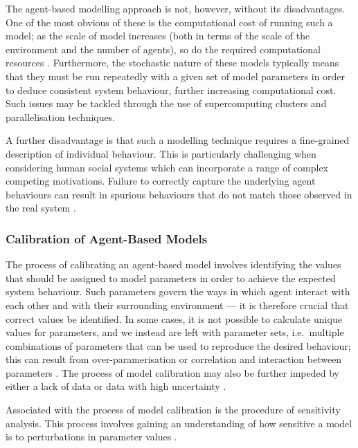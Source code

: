 The agent-based modelling approach is not, however, without its disadvantages.
One of the most obvious of these is the computational cost of running such a
model; as the scale of model increases (both in terms of the scale of the
environment and the number of agents), so do the required computational
resources \citep{bonabeau2002agent}.
Furthermore, the stochastic nature of these models typically means that they
must be run repeatedly with a given set of model parameters in order to deduce
consistent system behaviour, further increasing computational cost.
Such issues may be tackled through the use of supercomputing clusters and
parallelisation techniques.

A further disadvantage is that such a modelling technique requires a
fine-grained description of individual behaviour.
This is particularly challenging when considering human social systems which can
incorporate a range of complex competing motivations.
Failure to correctly capture the underlying agent behaviours can result in
spurious behaviours that do not match those observed in the real system
\citep{couclelis2002modeling}.

\subsubsection*{Calibration of Agent-Based Models}\label{subs:abm:calibration}

The process of calibrating an agent-based model involves identifying the values
that should be assigned to model parameters in order to achieve the expected
system behaviour.
Such parameters govern the ways in which agent interact with each other and with
their surrounding environment --- it is therefore crucial that correct values be
identified.
In some cases, it is not possible to calculate unique values for parameters, and
we instead are left with parameter sets, i.e.\ multiple combinations of
parameters that can be used to reproduce the desired behaviour; this can result
from over-paramerisation or correlation and interaction between parameters
\citep{gan2014comprehensive}.
The process of model calibration may also be further impeded by either a lack of
data or data with high uncertainty \citep{thiele2014facilitating}.

Associated with the process of model calibration is the procedure of sensitivity
analysis.
This process involves gaining an understanding of how sensitive a model is to
perturbations in parameter values \citep{kleijnen1995sensitivity}.

